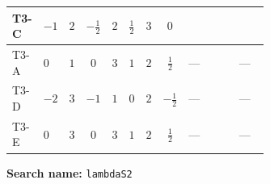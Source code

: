 \documentclass[8pt]{article}
\begin{document}
\begin{landscape}
\begin{longtable}{@{}llcccccc >{\raggedright\arraybackslash}p{0.21\linewidth} >{\raggedright\arraybackslash}p{0.21\linewidth} >{\raggedright\arraybackslash}p{0.21\linewidth}@{}}
\midrule
T3-C & $-1$ & $2$ & $-\frac{1}{2}$ & $2$ & $\frac{1}{2}$ & $3$ & $0$ & \scriptsize\adjustbox{max width=\linewidth}{$\begin{gathered} +\frac{3 {g_Y}^4}{4}\end{gathered}$} & \scriptsize\adjustbox{max width=\linewidth}{$\begin{gathered} +4 {\lambda_{12}}^2\end{gathered}$} & \scriptsize\adjustbox{max width=\linewidth}{$\begin{gathered} +\frac{{\lambda_{12}^{\rm Adj}}^2}{4}\end{gathered}$} \\
\midrule
T3-A & $0$ & $1$ & $0$ & $3$ & $1$ & $2$ & $\frac{1}{2}$ & --- & \scriptsize\adjustbox{max width=\linewidth}{$\begin{gathered} +2 {\lambda_{12}}^2\end{gathered}$} & --- \\
\midrule
T3-D & $-2$ & $3$ & $-1$ & $1$ & $0$ & $2$ & $-\frac{1}{2}$ & --- & \scriptsize\adjustbox{max width=\linewidth}{$\begin{gathered} 6 {\lambda_{12}}^2\end{gathered}$} & --- \\
\midrule
T3-E & $0$ & $3$ & $0$ & $3$ & $1$ & $2$ & $\frac{1}{2}$ & --- & \scriptsize\adjustbox{max width=\linewidth}{$\begin{gathered} +6 {\lambda_{12}}^2\end{gathered}$} & --- \\
\midrule
\bottomrule
\end{longtable}
\clearpage
\noindent\textbf{Search name: }\texttt{lambdaS2}\par\smallskip

\end{landscape}
\end{document}

